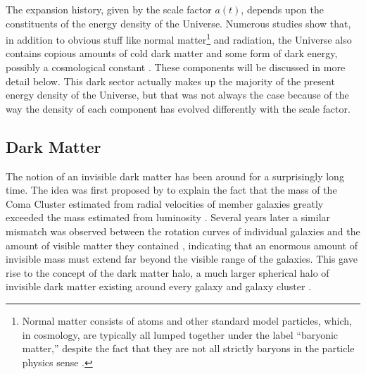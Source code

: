 The expansion history, given by the scale factor $a(t)$, depends upon the constituents of the energy density of the Universe. Numerous studies show that, in addition to obvious stuff like normal matter\footnote{Normal matter consists of atoms and other standard model particles, which, in cosmology, are typically all lumped together under the label ``baryonic matter,'' despite the fact that they are not all strictly baryons in the particle physics sense \citep{Roos10}.} and radiation, the Universe also contains copious amounts of cold dark matter and some form of dark energy, possibly a cosmological constant \citep[e.g.][]{DodelsonText}. These components will be discussed in more detail below. This dark sector actually makes up the majority of the present energy density of the Universe, but that was not always the case because of the way the density of each component has evolved differently with the scale factor.

\subsection{Dark Matter}
\label{sec:DM}

The notion of an invisible dark matter has been around for a surprisingly long time. The idea was first proposed by \citet{Zwicky33} to explain the fact that the mass of the Coma Cluster estimated from radial velocities of member galaxies greatly exceeded the mass estimated from luminosity \citep[see also][]{Zwicky37}. Several years later a similar mismatch was observed between the rotation curves of individual galaxies and the amount of visible matter they contained \citep{Babcock39}, indicating that an enormous amount of invisible mass must extend far beyond the visible range of the galaxies. This gave rise to the concept of the dark matter halo, a much larger spherical halo of invisible dark matter existing around every galaxy and galaxy cluster \citep[see][for a review of dark matter's discovery]{Bergh99}.


